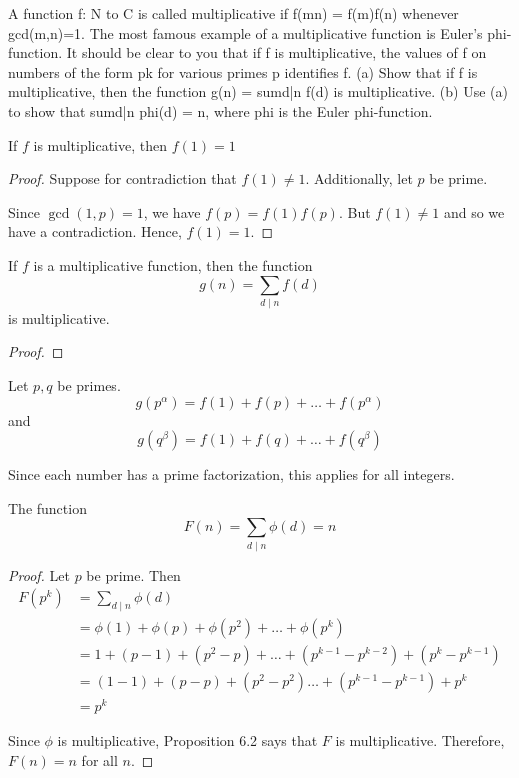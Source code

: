 
A function f: N to C is called multiplicative if f(mn) = f(m)f(n) whenever gcd(m,n)=1. The most famous example of a multiplicative function is Euler's phi-function. It should be clear to you that if f is multiplicative, the values of f on numbers of the form pk for various primes p identifies f. 
(a) Show that if f is multiplicative, then the function g(n) = sumd|n f(d) is multiplicative. 
(b) Use (a) to show that sumd|n phi(d) = n, where phi is the Euler phi-function. 

\begin{lemma}
    If $f$ is multiplicative, then $f(1) = 1$
\end{lemma}
\begin{proof}
    Suppose for contradiction that $f(1) \neq 1$. Additionally, let $p$ be
    prime.
    
    Since $\gcd(1, p) = 1$, we have $f(p) = f(1)f(p)$. But $f(1) \neq 1$ and so 
    we have a contradiction. Hence, $f(1) = 1$. 
\end{proof}

\begin{prop}[part a]
    If $f$ is a multiplicative function, then the function
    \[ g(n) = \sum_{d \mid n} f(d) \]
    is multiplicative.
\end{prop}
\begin{proof}
\end{proof}
    Let $p, q$ be primes. 
    \[ g(p^\alpha) = f(1) + f(p) + \ldots + f(p^\alpha) \]
    and
    \[ g(q^\beta) = f(1) + f(q) + \ldots + f(q^\beta) \]
    
    
    Since each number has a prime factorization, this applies for all integers.
\begin{prop}[part b]
    The function
    \[ F(n) = \sum_{d \mid n} \phi(d) = n \]
\end{prop}
\begin{proof}
    Let $p$ be prime. Then
    \begin{align*}
    F(p^k) &= \sum_{d \mid n} \phi(d) \\
           &= \phi(1) + \phi(p) + \phi(p^2) + \ldots + \phi(p^k) \\
           &= 1 + (p-1) + (p^2 - p) + \ldots + (p^{k-1} - p^{k-2}) + (p^k - p^{k-1}) \\
           &= (1-1) + (p-p) + (p^2 - p^2) \ldots + (p^{k-1} - p^{k-1}) + p^k \\
           &= p^k
    \end{align*}    

    Since $\phi$ is multiplicative, Proposition 6.2 says that $F$ is
    multiplicative. Therefore, $F(n) = n$ for all $n$.
\end{proof}
